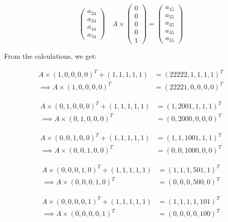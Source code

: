\documentclass{article}
\begin{document}
$$\begin{pmatrix}
        a_{24} \\
        a_{34} \\
        a_{44} \\
        a_{54}
    \end{pmatrix} \quad 
    A \times \begin{pmatrix}
        0 \\
        0 \\
        0 \\
        0 \\
        1
    \end{pmatrix} = \begin{pmatrix}
        a_{15} \\
        a_{25} \\
        a_{35} \\
        a_{45} \\
        a_{55}
    \end{pmatrix}
$$

From the calculations, we get:

\begin{align*}
    A \times (1, 0, 0, 0, 0)^T + (1, 1, 1, 1, 1) &= (22222, 1, 1, 1, 1)^T \\
    \implies A \times (1, 0, 0, 0, 0)^T &= (22221, 0, 0, 0, 0)^T
\end{align*}

\begin{align*}
    A \times (0, 1, 0, 0, 0)^T + (1, 1, 1, 1, 1) &= (1, 2001, 1, 1, 1)^T \\
    \implies A \times (0, 1, 0, 0, 0)^T &= (0, 2000, 0, 0, 0)^T
\end{align*}

\begin{align*}
    A \times (0, 0, 1, 0, 0)^T + (1, 1, 1, 1, 1) &= (1, 1, 1001, 1, 1)^T \\
    \implies A \times (0, 0, 1, 0, 0)^T &= (0, 0, 1000, 0, 0)^T
\end{align*}

\begin{align*}
    A \times (0, 0, 0, 1, 0)^T + (1, 1, 1, 1, 1) &= (1, 1, 1, 501, 1)^T \\
    \implies A \times (0, 0, 0, 1, 0)^T &= (0, 0, 0, 500, 0)^T
\end{align*}

\begin{align*}
    A \times (0, 0, 0, 0, 1)^T + (1, 1, 1, 1, 1) &= (1, 1, 1, 1, 101)^T \\
    \implies A \times (0, 0, 0, 0, 1)^T &= (0, 0, 0, 0, 100)^T
\end{align*}
\end{document}
